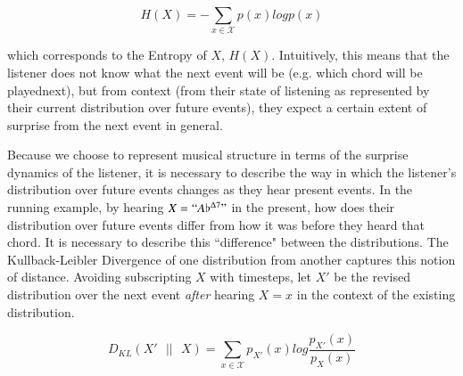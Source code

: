 \documentclass[final,authoryear,5p,times,twocolumn]{elsarticle}
\begin{document}
 $$ H(X) = - \sum_{x \in \mathcal{X}} p(x) logp(x)$$
 
\noindent which corresponds to the Entropy of $X$, $H(X)$. Intuitively, this means that the listener does not know what the next event will be (e.g. which chord will be playednext), but from context (from their state of listening as represented by their current distribution over future events), they expect a certain extent of surprise from the next event in general.

Because we choose to represent musical structure in terms of the surprise dynamics of the listener, it is necessary to describe the way in which the listener's distribution over future events changes as they hear present events. In the running example, by hearing $X=``A\flat^{\Delta7}"$ in the present, how does their distribution over future events differ from how it was before they heard that chord. It is necessary to describe this ``difference" between the distributions. The Kullback-Leibler Divergence of one distribution from another captures this notion of distance. Avoiding subscripting $X$ with timesteps, let  $X'$ be the revised distribution over the next event \textit{after} hearing $X=x$ in the context of the existing distribution.

$$ D_{KL}(X'\textrm{ }|| \textrm{ } X) =  \sum_{x \in \mathcal{X}} p_{X'}(x) log\frac{p_{X'}(x) }{p_{X}(x)}$$
\end{document}
